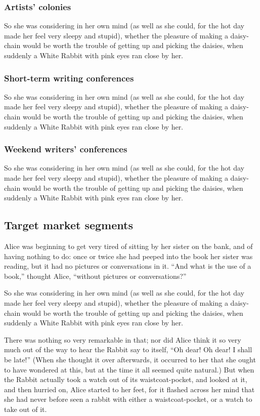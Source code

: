 \documentclass[12pt]{article}
\begin{document}
\subsubsection{Artists' colonies}
\label{sec-3-2-3}
So she was considering in her own mind (as well as she could, for the hot day made her feel very sleepy and stupid), whether the pleasure of making a daisy-chain would be worth the trouble of getting up and picking the daisies, when suddenly a White Rabbit with pink eyes ran close by her. 

\subsubsection{Short-term writing conferences}
\label{sec-3-2-4}
So she was considering in her own mind (as well as she could, for the hot day made her feel very sleepy and stupid), whether the pleasure of making a daisy-chain would be worth the trouble of getting up and picking the daisies, when suddenly a White Rabbit with pink eyes ran close by her. 

\subsubsection{Weekend writers' conferences}
\label{sec-3-2-5}
So she was considering in her own mind (as well as she could, for the hot day made her feel very sleepy and stupid), whether the pleasure of making a daisy-chain would be worth the trouble of getting up and picking the daisies, when suddenly a White Rabbit with pink eyes ran close by her. 

\subsection{Target market segments}
\label{sec-3-3}
Alice was beginning to get very tired of sitting by her sister on the bank, and of having nothing to do: once or twice she had peeped into the book her sister was reading, but it had no pictures or conversations in it. ``And what is the use of a book,'' thought Alice, ``without pictures or conversations?'' 

So she was considering in her own mind (as well as she could, for the hot day made her feel very sleepy and stupid), whether the pleasure of making a daisy-chain would be worth the trouble of getting up and picking the daisies, when suddenly a White Rabbit with pink eyes ran close by her.

There was nothing so very remarkable in that; nor did Alice think it so very much out of the way to hear the Rabbit say to itself, ``Oh dear! Oh dear! I shall be late!'' (When she thought it over afterwards, it occurred to her that she ought to have wondered at this, but at the time it all seemed quite natural.) But when the Rabbit actually took a watch out of its waistcoat-pocket, and looked at it, and then hurried on, Alice started to her feet, for it flashed across her mind that she had never before seen a rabbit with either a waistcoat-pocket, or a watch to take out of it. 
\end{document}
